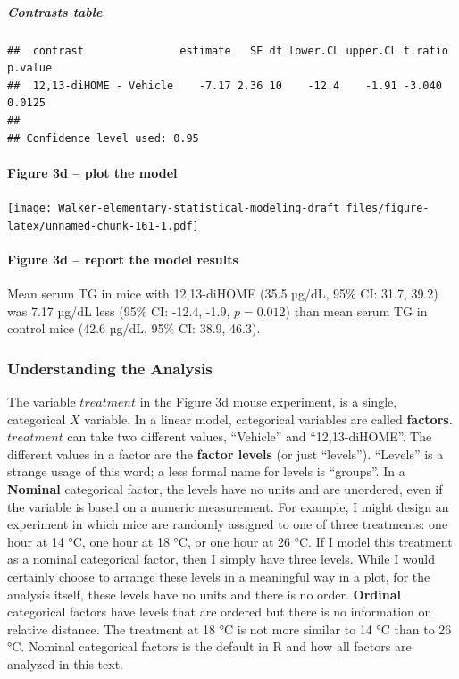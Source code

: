 \documentclass[]{book}
\let\oldparagraph\paragraph
\renewcommand{\paragraph}[1]{\oldparagraph{#1}\mbox{}}
\let\oldsubparagraph\subparagraph
\renewcommand{\subparagraph}[1]{\oldsubparagraph{#1}\mbox{}}
\begin{document}
\hypertarget{contrasts-table}{%
\subparagraph{Contrasts table}\label{contrasts-table}}

\begin{verbatim}
##  contrast               estimate   SE df lower.CL upper.CL t.ratio p.value
##  12,13-diHOME - Vehicle    -7.17 2.36 10    -12.4    -1.91 -3.040  0.0125 
## 
## Confidence level used: 0.95
\end{verbatim}

\hypertarget{figure-3d-plot-the-model}{%
\paragraph{Figure 3d -- plot the model}\label{figure-3d-plot-the-model}}

\texttt{[image: Walker-elementary-statistical-modeling-draft\_files/figure-latex/unnamed-chunk-161-1.pdf]}

\hypertarget{figure-3d-report-the-model-results}{%
\paragraph{Figure 3d -- report the model results}\label{figure-3d-report-the-model-results}}

Mean serum TG in mice with 12,13-diHOME (35.5 µg/dL, 95\% CI: 31.7, 39.2) was 7.17 µg/dL less (95\% CI: -12.4, -1.9, \(p = 0.012\)) than mean serum TG in control mice (42.6 µg/dL, 95\% CI: 38.9, 46.3).

\hypertarget{understanding-the-analysis}{%
\subsubsection{Understanding the Analysis}\label{understanding-the-analysis}}

The variable \(treatment\) in the Figure 3d mouse experiment, is a single, categorical \(X\) variable. In a linear model, categorical variables are called \textbf{factors}. \(treatment\) can take two different values, ``Vehicle'' and ``12,13-diHOME''. The different values in a factor are the \textbf{factor levels} (or just ``levels''). ``Levels'' is a strange usage of this word; a less formal name for levels is ``groups''. In a \textbf{Nominal} categorical factor, the levels have no units and are unordered, even if the variable is based on a numeric measurement. For example, I might design an experiment in which mice are randomly assigned to one of three treatments: one hour at 14 °C, one hour at 18 °C, or one hour at 26 °C. If I model this treatment as a nominal categorical factor, then I simply have three levels. While I would certainly choose to arrange these levels in a meaningful way in a plot, for the analysis itself, these levels have no units and there is no order. \textbf{Ordinal} categorical factors have levels that are ordered but there is no information on relative distance. The treatment at 18 °C is not more similar to 14 °C than to 26 °C. Nominal categorical factors is the default in R and how all factors are analyzed in this text.
\end{document}
